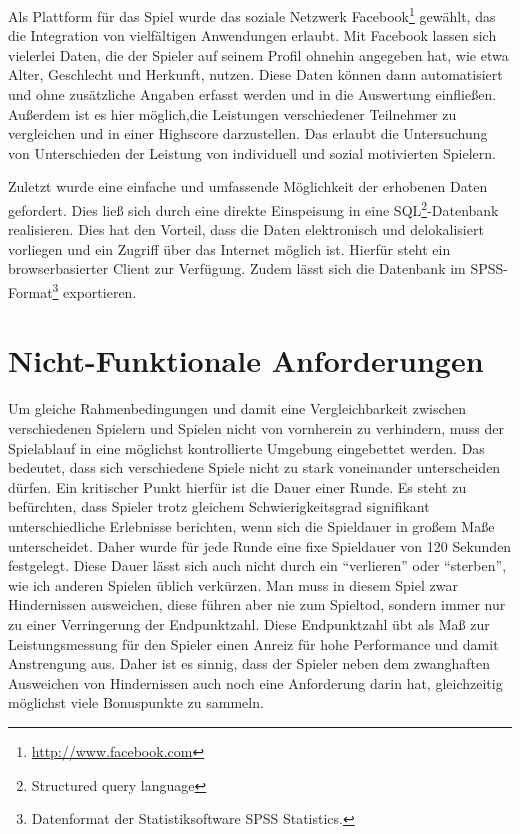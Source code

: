 \documentclass[a4paper,12pt]{scrartcl}
\begin{document}
Als Plattform für das Spiel wurde das soziale Netzwerk Facebook\footnote{\url{http://www.facebook.com}} gewählt, das die
Integration von vielfältigen Anwendungen erlaubt. Mit Facebook lassen sich vielerlei Daten,
die der Spieler auf seinem Profil ohnehin angegeben hat, wie etwa Alter, Geschlecht und
Herkunft, nutzen. Diese Daten können dann automatisiert und ohne zusätzliche Angaben
erfasst werden und in die Auswertung einfließen.\newline
Außerdem ist es hier möglich,die Leistungen verschiedener Teilnehmer zu vergleichen
und in einer Highscore darzustellen. Das erlaubt die Untersuchung von Unterschieden der
Leistung von individuell und sozial motivierten Spielern.

Zuletzt wurde eine einfache und umfassende Möglichkeit der erhobenen Daten gefordert.
Dies ließ sich durch eine direkte Einspeisung in eine SQL\footnote{Structured query language}-Datenbank realisieren. Dies hat den Vorteil, dass die Daten elektronisch und delokalisiert vorliegen und ein Zugriff über das Internet möglich ist. Hierfür steht ein browserbasierter Client zur Verfügung. Zudem lässt sich die Datenbank im SPSS-Format\footnote{Datenformat der Statistiksoftware SPSS Statistics.} exportieren.


\section{Nicht-Funktionale Anforderungen}
Um gleiche Rahmenbedingungen und damit eine Vergleichbarkeit zwischen verschiedenen
Spielern und Spielen nicht von vornherein zu verhindern, muss der Spielablauf in
eine möglichst kontrollierte Umgebung eingebettet werden. Das bedeutet, dass sich
verschiedene Spiele nicht zu stark voneinander unterscheiden dürfen. Ein kritischer Punkt
hierfür ist die Dauer einer Runde. Es steht zu befürchten, dass Spieler trotz gleichem
Schwierigkeitsgrad signifikant unterschiedliche Erlebnisse berichten, wenn sich die
Spieldauer in großem Maße unterscheidet. Daher wurde für jede Runde eine fixe Spieldauer
von 120 Sekunden festgelegt. Diese Dauer lässt sich auch nicht durch ein "`verlieren"'
oder "`sterben"', wie ich anderen Spielen üblich verkürzen. Man muss in diesem Spiel zwar
Hindernissen ausweichen, diese führen aber nie zum Spieltod, sondern immer nur zu einer
Verringerung der Endpunktzahl. Diese Endpunktzahl übt als Maß zur Leistungsmessung für
den Spieler einen Anreiz für hohe Performance und damit Anstrengung aus. Daher ist es
sinnig, dass der Spieler neben dem zwanghaften Ausweichen von Hindernissen auch noch
eine Anforderung darin hat, gleichzeitig möglichst viele Bonuspunkte zu sammeln.
\end{document}
